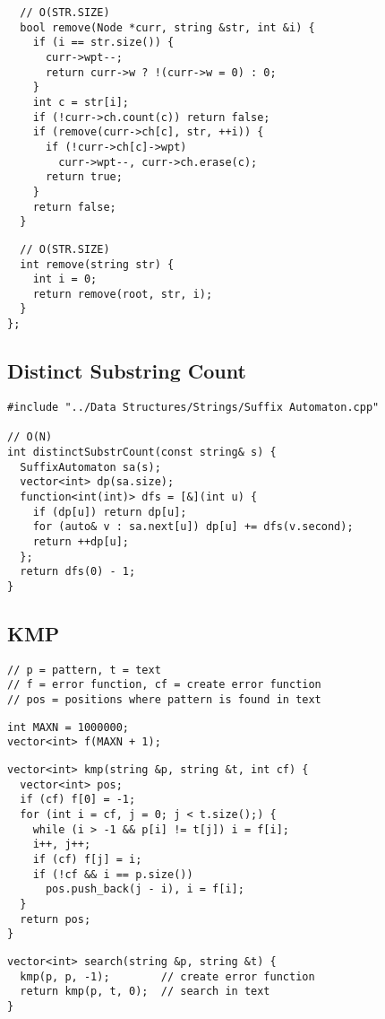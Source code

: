 \documentclass[twoside]{article}
\begin{document}
\begin{multicols*}{2}
\begin{verbatim}
  // O(STR.SIZE)
  bool remove(Node *curr, string &str, int &i) {
    if (i == str.size()) {
      curr->wpt--;
      return curr->w ? !(curr->w = 0) : 0;
    }
    int c = str[i];
    if (!curr->ch.count(c)) return false;
    if (remove(curr->ch[c], str, ++i)) {
      if (!curr->ch[c]->wpt)
        curr->wpt--, curr->ch.erase(c);
      return true;
    }
    return false;
  }
\end{verbatim}
\vspace{-12pt}
\begin{verbatim}
  // O(STR.SIZE)
  int remove(string str) {
    int i = 0;
    return remove(root, str, i);
  }
};
\end{verbatim}

\subsectionfont{\large\bfseries\sffamily\underline}
\subsection*{Distinct Substring Count}
\begin{verbatim}
#include "../Data Structures/Strings/Suffix Automaton.cpp"

// O(N)
int distinctSubstrCount(const string& s) {
  SuffixAutomaton sa(s);
  vector<int> dp(sa.size);
  function<int(int)> dfs = [&](int u) {
    if (dp[u]) return dp[u];
    for (auto& v : sa.next[u]) dp[u] += dfs(v.second);
    return ++dp[u];
  };
  return dfs(0) - 1;
}
\end{verbatim}

\subsectionfont{\large\bfseries\sffamily\underline}
\subsection*{KMP}
\begin{verbatim}
// p = pattern, t = text
// f = error function, cf = create error function
// pos = positions where pattern is found in text
\end{verbatim}
\vspace{-12pt}
\begin{verbatim}
int MAXN = 1000000;
vector<int> f(MAXN + 1);
\end{verbatim}
\vspace{-12pt}
\begin{verbatim}
vector<int> kmp(string &p, string &t, int cf) {
  vector<int> pos;
  if (cf) f[0] = -1;
  for (int i = cf, j = 0; j < t.size();) {
    while (i > -1 && p[i] != t[j]) i = f[i];
    i++, j++;
    if (cf) f[j] = i;
    if (!cf && i == p.size())
      pos.push_back(j - i), i = f[i];
  }
  return pos;
}
\end{verbatim}
\vspace{-12pt}
\begin{verbatim}
vector<int> search(string &p, string &t) {
  kmp(p, p, -1);        // create error function
  return kmp(p, t, 0);  // search in text
}
\end{verbatim}


\end{multicols*}
\end{document}
